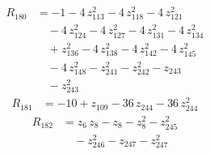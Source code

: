 \begin{equation*}\begin{aligned}
R_{180}&=-1 -4\,z_{113}^{2} -4\,z_{118}^{2} -4\,z_{121}^{2} \\
&\quad -4\,z_{124}^{2} -4\,z_{127}^{2} -4\,z_{131}^{2} -4\,z_{134}^{2} \\
&\quad +z_{136}^{2} -4\,z_{138}^{2} -4\,z_{142}^{2} -4\,z_{145}^{2} \\
&\quad -4\,z_{148}^{2} -z_{241}^{2} -z_{242}^{2} -z_{243} \\
&\quad -z_{243}^{2}
\end{aligned}\end{equation*}
\begin{equation*}\begin{aligned}
R_{181}&=-10 +z_{109} -36\,z_{244} -36\,z_{244}^{2}
\end{aligned}\end{equation*}
\begin{equation*}\begin{aligned}
R_{182}&=z_{6}\,z_{8} -z_{8} -z_{8}^{2} -z_{245}^{2} \\
&\quad -z_{246}^{2} -z_{247} -z_{247}^{2}
\end{aligned}\end{equation*}
